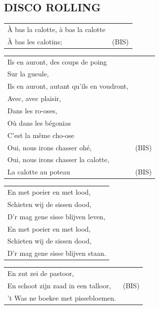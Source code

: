 \documentclass{article}
\begin{document}
\subsection*{DISCO ROLLING}
\begin{flushleft}
\begin{tabularx}{0.8\textwidth} {
   >{\raggedright\arraybackslash}X | c}
   À bas la calotte, à bas la calotte & \\
À bas les calotins; & (BIS)\\\end{tabularx}
\begin{tabularx}{0.8\textwidth} {
   >{\raggedright\arraybackslash}X c}
Ils en auront, des coups de poing\\
Sur la gueule,\\
Ils en auront, autant qu’ils en voudront,\\
Avec, avec plaisir,\\
Dans les ro-oses,\\
Où dans les bégonias\\
C’est la même cho-ose\\
Oui, nous irons chasser ohé, & (BIS)\\
Oui, nous irons chasser la calotte,\\
La calotte au poteau & (BIS)\\
\end{tabularx}
\end{flushleft}\begin{flushleft}
\begin{tabularx}{0.8\textwidth} {
   >{\raggedright\arraybackslash}X}
En met poeier en met lood,\\
Schieten wij de sissen dood,\\
D’r mag gene sisse blijven leven,\\
En met poeier en met lood,\\
Schieten wij de sissen dood,\\
D’r mag gene sisse blijven staan.\\
\end{tabularx}
\begin{tabularx}{0.8\textwidth} {
   >{\raggedright\arraybackslash}X | c}
En zut zei de pastoor, & \\
En schoot zijn zaad in een talloor, & (BIS)\\
’t Was ne boekee met pissebloemen. & \\
\end{tabularx}
\end{flushleft}\begin{flushleft}

\end{flushleft}
\end{document}
